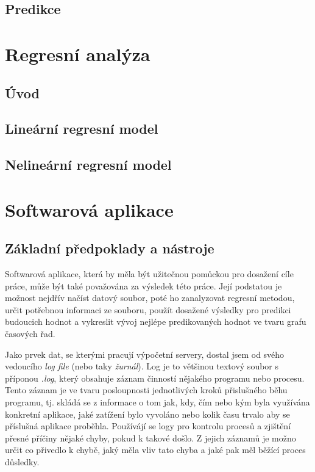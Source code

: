 \documentclass[a4paper,12pt,twoside]{scrreprt}
\begin{document}
\subsection{Predikce}

\section{Regresní analýza}
\subsection{Úvod}
\subsection{Lineární regresní model}
\subsection{Nelineární regresní model}

\newpage
\section{Softwarová aplikace}
\subsection{Základní předpoklady a nástroje}
Softwarová aplikace, která by měla být užitečnou pomůckou pro dosažení cíle práce, může být také považována za výsledek této práce. Její podstatou je možnost nejdřív načíst datový soubor, poté ho zanalyzovat regresní metodou, určit potřebnou informaci ze souboru, použít dosažené výsledky pro predikci budoucich hodnot a vykreslit vývoj nejlépe predikovaných hodnot ve tvaru grafu časových řad. 

Jako prvek dat, se kterými pracují výpočetní servery, dostal jsem od svého vedoucího \textit{log file} (nebo taky \textit{žurnál}). Log je to většinou textový soubor s příponou \textit{.log}, který obsahuje záznam činností nějakého programu nebo procesu. Tento záznam je ve tvaru posloupnosti jednotlivých kroků přislušného běhu programu, tj. skládá se z informace o tom jak, kdy, čím nebo kým byla využívána konkretní aplikace, jaké zatížení bylo vyvoláno nebo kolik času trvalo aby se příslušná aplikace proběhla. Používájí se logy pro kontrolu procesů a zjištění přesné příčiny nějaké chyby, pokud k takové došlo. Z jejich záznamů je možno určit co přivedlo k chybě, jaký měla vliv tato chyba a jaké pak měl běžící proces důsledky. 
\end{document}
